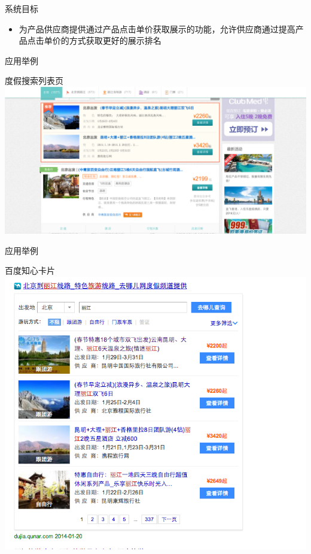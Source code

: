 \documentclass{beamer}
\begin{document}
\begin{CJK}{UTF8}{gbsn}
\begin{frame}{系统目标}
  \begin{itemize}
  \item {
    为产品供应商提供通过产品点击单价获取展示的功能，允许供应商通过提高产品点击单价的方式获取更好的展示排名
  }
  \end{itemize}
\end{frame}

\begin{frame}{应用举例}
  \begin{block}{度假搜索列表页}
    \includegraphics[scale=0.22]{./imgs/overview-qunar}
  \end{block}
\end{frame}

\begin{frame}{应用举例}
  \begin{block}{百度知心卡片}
    \includegraphics[scale=0.3]{./imgs/overview-baidu}
  \end{block}
\end{frame}


\end{CJK}
\end{document}
